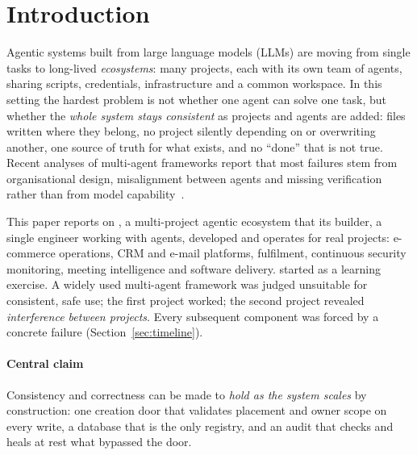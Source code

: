\section{Introduction}\label{sec:intro}
Agentic systems built from large language models (LLMs) are moving from single tasks to long-lived \emph{ecosystems}: many projects, each with its own team of agents, sharing scripts, credentials, infrastructure and a common workspace. In this setting the hardest problem is not whether one agent can solve one task, but whether the \emph{whole system stays consistent} as projects and agents are added: files written where they belong, no project silently depending on or overwriting another, one source of truth for what exists, and no ``done'' that is not true. Recent analyses of multi-agent frameworks report that most failures stem from organisational design, misalignment between agents and missing verification rather than from model capability~\cite{cemri2025mast}.

This paper reports on \sys{}, a multi-project agentic ecosystem that its builder, a single engineer working with agents, developed and operates for real projects: e-commerce operations, CRM and e-mail platforms, fulfilment, continuous security monitoring, meeting intelligence and software delivery. \sys{} started as a learning exercise. A widely used multi-agent framework was judged unsuitable for consistent, safe use; the first project worked; the second project revealed \emph{interference between projects}. Every subsequent component was forced by a concrete failure (Section~\ref{sec:timeline}).

\paragraph*{Central claim} Consistency and correctness can be made to \emph{hold as the system scales} by construction: one creation door that validates placement and owner scope on every write, a database that is the only registry, and an audit that checks and heals at rest what bypassed the door.


